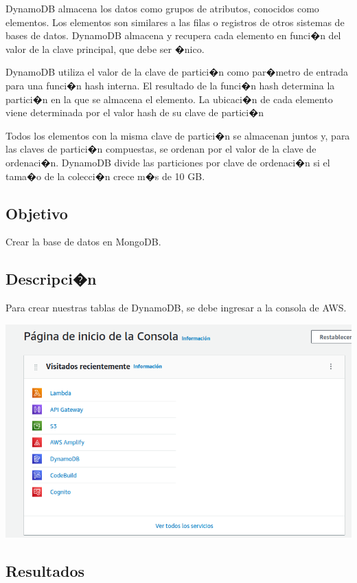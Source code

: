 \documentclass[12pt,letterpaper]{article}
\begin{document}
DynamoDB almacena los datos como grupos de atributos, conocidos como elementos. Los elementos son similares a las filas o registros de otros sistemas de bases de datos. DynamoDB almacena y recupera cada elemento en funci�n del valor de la clave principal, que debe ser �nico.

DynamoDB utiliza el valor de la clave de partici�n como par�metro de entrada para una funci�n hash interna. El resultado de la funci�n hash determina la partici�n en la que se almacena el elemento. La ubicaci�n de cada elemento viene determinada por el valor hash de su clave de partici�n

Todos los elementos con la misma clave de partici�n se almacenan juntos y, para las claves de partici�n compuestas, se ordenan por el valor de la clave de ordenaci�n. DynamoDB divide las particiones por clave de ordenaci�n si el tama�o de la colecci�n crece m�s de 10 GB\cite{dynamo}.

\subsection{Objetivo}
Crear la base de datos en MongoDB.


\subsection{Descripci�n}

Para crear nuestras tablas de DynamoDB, se debe ingresar a la consola de AWS.

\begin{center}
  \includegraphics[scale=0.5]{imagenes/aws}
 \label{fig:cognito} 
\end{center} 
\subsection{Resultados}
\end{document}
